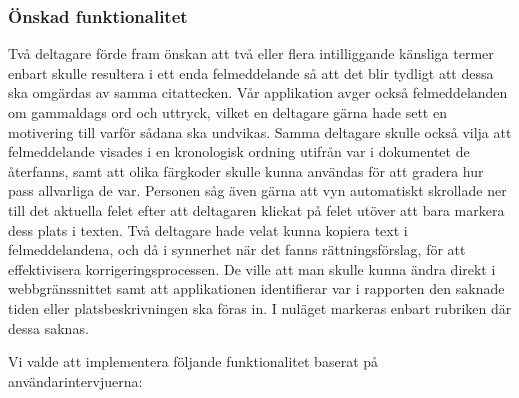 \documentclass[swedish]{maucsthesis}
\begin{document}
\subsubsection{Önskad funktionalitet}\label{önskvärdafunktioner}

Två deltagare förde fram önskan att två eller flera intilliggande känsliga
termer enbart skulle resultera i ett enda felmeddelande så att det blir tydligt
att dessa ska omgärdas av samma citattecken. Vår applikation avger också
felmeddelanden om gammaldags ord och uttryck, vilket en deltagare gärna hade
sett en motivering till varför sådana ska undvikas. Samma deltagare skulle också
vilja att felmeddelande visades i en kronologisk ordning utifrån var i
dokumentet de återfanns, samt att olika färgkoder skulle kunna användas för att
gradera hur pass allvarliga de var. Personen såg även gärna att vyn automatiskt
skrollade ner till det aktuella felet efter att deltagaren klickat på felet
utöver att bara markera dess plats i texten. Två deltagare hade velat kunna
kopiera text i felmeddelandena, och då i synnerhet när det fanns
rättningsförslag, för att effektivisera korrigeringsprocessen. De ville att man
skulle kunna ändra direkt i webbgränssnittet samt att applikationen identifierar
var i rapporten den saknade tiden eller platsbeskrivningen ska föras in. I
nuläget markeras enbart rubriken där dessa saknas.

Vi valde att implementera följande funktionalitet baserat på
användarintervjuerna:
\end{document}
